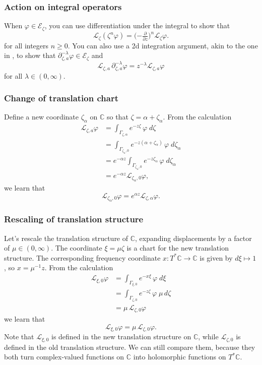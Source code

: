 \documentclass{article}
\newcommand{\maps}{\colon}
\newcommand{\C}{\mathbb{C}}
\newcommand{\fracderiv}[3]{\partial^{#1}_{#2, #3}}
\newcommand{\laplace}{\mathcal{L}}
\begin{document}
\subsubsection{Action on integral operators}\label{L-int-op}
When $\varphi \in \mathcal{E}_\zeta$, you can use differentiation under the integral to show that~\cite[Theorem~1.34]{laplace-tfm}
\begin{equation}%
\laplace_\zeta (\zeta^n \varphi) = \big({-\tfrac{\partial}{\partial z}}\big)^n \laplace_\zeta \varphi.
\end{equation}
for all integers $n \ge 0$. You can also use a 2d integration argument, akin to the one in \cite[Theorem~2.39]{laplace-tfm}, to show that $\fracderiv{-\lambda}{\zeta}{a} \varphi \in \mathcal{E}_\zeta$ and
\[ \laplace_{\zeta, a}\,\fracderiv{-\lambda}{\zeta}{a} \varphi = z^{-\lambda} \laplace_{\zeta, a} \varphi \]
for all $\lambda \in (0, \infty)$.
\subsubsection{Change of translation chart}\label{translation}
Define a new coordinate $\zeta_\alpha$ on $\C$ so that $\zeta = \alpha + \zeta_\alpha$. From the calculation
\begin{align*}
\laplace_{\zeta, a} \varphi & = \int_{\Gamma_{\zeta, \alpha}} e^{-z \zeta}\,\varphi\;d\zeta \\
& = \int_{\Gamma_{\zeta_\alpha, 0}} e^{-z(\alpha + \zeta_\alpha)}\,\varphi\;d\zeta_\alpha \\
& = e^{-\alpha z} \int_{\Gamma_{\zeta_\alpha, 0}} e^{-z\zeta_\alpha}\,\varphi\;d\zeta_\alpha \\
& = e^{-\alpha z} \laplace_{\zeta_\alpha, 0} \varphi,
\end{align*}
we learn that
\[ \laplace_{\zeta_\alpha, 0} \varphi = e^{\alpha z} \laplace_{\zeta, \alpha} \varphi. \]
\subsubsection{Rescaling of translation structure}
Let's rescale the translation structure of $\C$, expanding displacements by a factor of $\mu \in (0, \infty)$. The coordinate $\xi = \mu\zeta$ is a chart for the new translation structure. The corresponding frequency coordinate $x \maps T^*\C \to \C$ is given by $d\xi \mapsto 1$, so $x = \mu^{-1} z$. From the calculation
\begin{align*}
\laplace_{\xi, 0} \varphi & = \int_{\Gamma_{\xi, 0}} e^{-x\xi}\,\varphi\;d\xi \\
& = \int_{\Gamma_{\zeta, 0}} e^{-z \zeta}\,\varphi\;\mu\,d\zeta \\
& = \mu\,\laplace_{\zeta, 0} \varphi
\end{align*}
we learn that
\[ \laplace_{\xi, 0} \varphi = \mu\,\laplace_{\zeta, 0} \varphi. \]
Note that $\laplace_{\xi, 0}$ is defined in the new translation structure on $\C$, while $\laplace_{\zeta, 0}$ is defined in the old translation structure. We can still compare them, because they both turn complex-valued functions on $\C$ into holomorphic functions on $T^*\C$.
\end{document}
